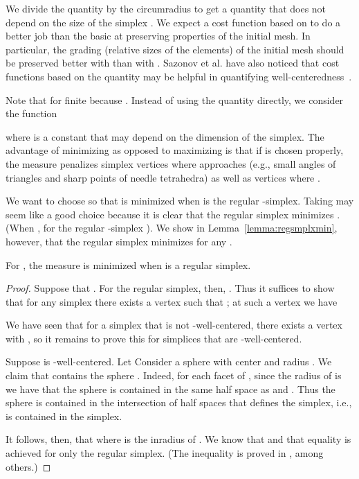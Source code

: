 \documentclass[final]{siamltex}
\begin{document}
We divide the quantity  by the circumradius
 to get a quantity that does not depend on the size of
the simplex .  We expect a cost function based on
 to do a better job than the basic
 at preserving properties of the initial mesh.
In particular, the grading (relative sizes of the elements) of the
initial mesh should be preserved better with  than with .
Sazonov et al. have also noticed that cost functions based on the
quantity  may be helpful in quantifying
well-centeredness~\cite{SaHaMoWe2006}.





Note that  for finite
 because .  Instead of using the quantity  directly,
we consider the function

where  is a constant that may depend on the dimension
 of the simplex.  The advantage of minimizing  as opposed to
maximizing  is that if  is chosen properly, the measure
penalizes simplex vertices where  approaches  (e.g., small
angles of triangles and sharp points of needle tetrahedra) as well as
vertices where .

We want to choose  so that  is minimized
when  is the regular -simplex.  Taking 
may seem like a good choice because it is clear that the regular
simplex minimizes .  (When ,  for the regular -simplex ).  We show in
Lemma~\ref{lemma:regsmplxmin}, however, that the regular simplex
minimizes  for any .

\bigskip

\begin{lemma}
  For , the measure  is minimized
  when  is a regular simplex.
\label{lemma:regsmplxmin}
\end{lemma}
\begin{proof}
  Suppose that .  For the regular simplex, then,
  .  Thus it suffices to show
  that for any simplex  there exists a
  vertex  such that ;
  at such a vertex we have
  
  
  We have seen that for a simplex that is not
  -well-centered, there exists a vertex  with , so it remains to prove this for simplices that are
  -well-centered.

  Suppose  is -well-centered.  Let  Consider a sphere  with center  and radius .  We
  claim that  contains the sphere .  Indeed, for
  each facet  of , since the radius of
   is  we have that the sphere
   is contained in the same half space as  and
  .  Thus the sphere is contained in the intersection of half
  spaces that defines the simplex, i.e., is contained in the simplex.

  It follows, then, that  where 
  is the inradius of .  We know that 
  and that equality is achieved for only the regular simplex.  (The
  inequality  is proved in \cite{KlTs1979}, among
  others.)
\end{proof}
\end{document}
